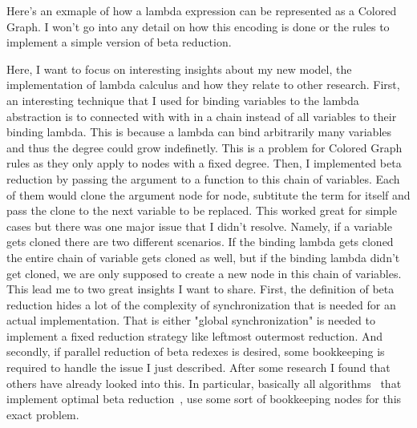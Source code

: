 \begin{center}
\end{center}

Here's an exmaple of how a lambda expression can be represented as a Colored Graph.
I won't go into any detail on how this encoding is done or the rules to implement a simple version of beta reduction.

Here, I want to focus on interesting insights about my new model, the implementation of lambda calculus and how they relate to other research.
First, an interesting technique that I used for binding variables to the lambda abstraction is to connected with with in a chain instead of all variables to their binding lambda.
This is because a lambda can bind arbitrarily many variables and thus the degree could grow indefinetly.
This is a problem for Colored Graph rules as they only apply to nodes with a fixed degree.
Then, I implemented beta reduction by passing the argument to a function to this chain of variables.
Each of them would clone the argument node for node, subtitute the term for itself and pass the clone to the next variable to be replaced.
This worked great for simple cases but there was one major issue that I didn't resolve.
Namely, if a variable gets cloned there are two different scenarios.
If the binding lambda gets cloned the entire chain of variable gets cloned as well, but if the binding lambda didn't get cloned, we are only supposed to create a new node in this chain of variables.
This lead me to two great insights I want to share.
First, the definition of beta reduction hides a lot of the complexity of synchronization that is needed for an actual implementation.
That is either "global synchronization" is needed to implement a fixed reduction strategy like leftmost outermost reduction.
And secondly, if parallel reduction of beta redexes is desired, some bookkeeping is required to handle the issue I just described.
After some research I found that others have already looked into this.
In particular, basically all algorithms~\cite{lamping, asperti1998optimal, van2004lambdascope} that implement optimal beta reduction~\cite{levy1978reductions}, use some sort of bookkeeping nodes for this exact problem.

